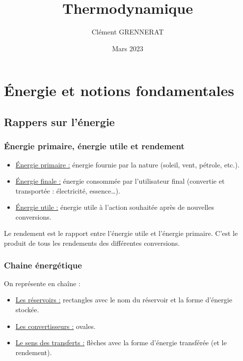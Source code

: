 \documentclass[13pt, twoside, a4paper, french]{report}
\newcommand*{\getSubject}{Thermodynamique}
\begin{document}
    \title{\getSubject}
    \author{Clément GRENNERAT}
    \date{Mars 2023}
    \tableofcontents


    \chapter{Énergie et notions fondamentales}\label{ch:energie-et-notions-fondamentales-de-thermodynamique}


        \section{Rappers sur l'énergie}\label{sec:rappers-sur-l'energie}

            \subsection{Énergie primaire, énergie utile et rendement}\label{subsec:energie-primaire-energie-utile-et-rendement}

                \begin{itemize}
                    \item \underline{Énergie primaire :} énergie fournie par la nature (soleil, vent, pétrole, etc.).
                    \item \underline{Énergie finale :} énergie consommée par l'utilisateur final (convertie et transportée : électricité, essence\ldots).
                    \item \underline{Énergie utile :} énergie utile à l'action souhaitée après de nouvelles conversions.
                \end{itemize}
                Le rendement est le rapport entre l'énergie utile et l'énergie primaire.
                C'est le produit de tous les rendements des différentes conversions.

            \subsection{Chaine énergétique}\label{subsec:chaine-energetique}

                On représente en chaîne :
                \begin{itemize}
                    \item \underline{Les réservoirs :} rectangles avec le nom du réservoir et la forme d'énergie stockée.
                    \item \underline{Les convertisseurs :} ovales.
                    \item \underline{Le sens des transferts :} flèches avec la forme d'énergie transférée (et le rendement).
                \end{itemize}
\end{document}
